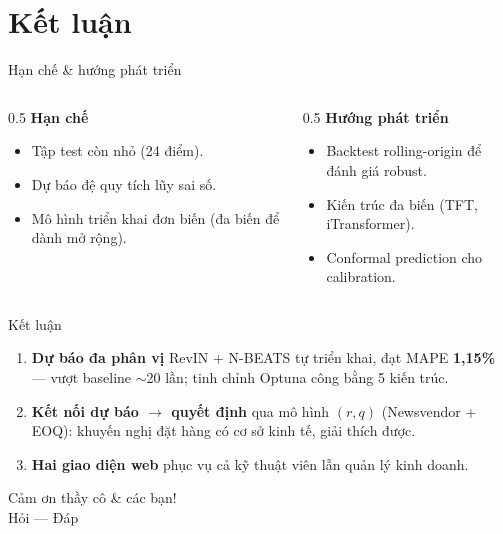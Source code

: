 \documentclass[aspectratio=169,11pt]{beamer}
\begin{document}
\section{Kết luận}

\begin{frame}{Hạn chế \& hướng phát triển}
  \begin{columns}[T]
    \begin{column}{0.5\textwidth}
      \textbf{Hạn chế}
      \begin{itemize}\small
        \item Tập test còn nhỏ (24 điểm).
        \item Dự báo đệ quy tích lũy sai số.
        \item Mô hình triển khai đơn biến (đa biến để dành mở rộng).
      \end{itemize}
    \end{column}
    \begin{column}{0.5\textwidth}
      \textbf{Hướng phát triển}
      \begin{itemize}\small
        \item Backtest rolling-origin để đánh giá robust.
        \item Kiến trúc đa biến (TFT, iTransformer).
        \item Conformal prediction cho calibration.
      \end{itemize}
    \end{column}
  \end{columns}
\end{frame}

\begin{frame}{Kết luận}
  \begin{enumerate}
    \item \textbf{Dự báo đa phân vị} RevIN + N-BEATS tự triển khai, đạt MAPE
          \textbf{1,15\%} --- vượt baseline $\sim$20 lần; tinh chỉnh Optuna công bằng 5 kiến trúc.
    \item \textbf{Kết nối dự báo $\rightarrow$ quyết định} qua mô hình $(r,q)$ (Newsvendor + EOQ):
          khuyến nghị đặt hàng có cơ sở kinh tế, giải thích được.
    \item \textbf{Hai giao diện web} phục vụ cả kỹ thuật viên lẫn quản lý kinh doanh.
  \end{enumerate}
\end{frame}

\begin{frame}[standout]
  Cảm ơn thầy cô \& các bạn!\\[0.3cm]
  \large Hỏi --- Đáp
\end{frame}
\end{document}
